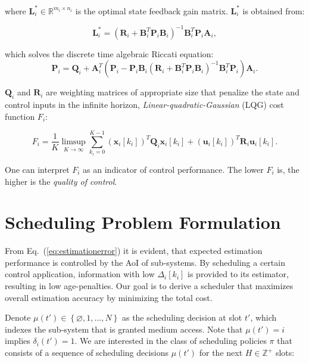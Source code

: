 where $\boldsymbol{L}_i^* \in \mathbb{R}^{m_i \times n_i}$ is the optimal state
feedback gain matrix. $\boldsymbol{L}^*_i$ is obtained from:

\begin{equation}
  \label{eq:optimalgain}
  \boldsymbol{L}_i^* = \left(\boldsymbol{R}_i + \boldsymbol{B}_i^T \boldsymbol{P}_i \boldsymbol{B}_i \right)^{-1} \boldsymbol{B}_i^T \boldsymbol{P}_i \boldsymbol{A}_i,
\end{equation}

which solves the discrete time algebraic Riccati equation:
\begin{equation}
  \label{eq:riccati}
  \boldsymbol{P}_i = \boldsymbol{Q}_{i} + \boldsymbol{A}_i^T \left(\boldsymbol{P}_i - \boldsymbol{P}_i \boldsymbol{B}_i ( \boldsymbol{R}_{i} + \boldsymbol{B}_i^T \boldsymbol{P}_i \boldsymbol{B}_i)^{- 1} \boldsymbol{B}_i^T \boldsymbol{P}_i \right) \boldsymbol{A}_i.
\end{equation}

$\boldsymbol{Q}_{i}$ and $\boldsymbol{R}_{i}$ are weighting matrices of
appropriate size that penalize the state and control inputs in the infinite
horizon, \textit{Linear-quadratic-Gaussian} (LQG) cost function $F_i$:

\begin{equation}
  F_i = \dfrac{1}{K} \limsup_{K \rightarrow \infty} \sum_{k_i=0}^{K-1} (\boldsymbol{x}_i[k_i])^T \boldsymbol{Q}_i \boldsymbol{x}_i[k_i] +  (\boldsymbol{u}_i[k_i])^T \boldsymbol{R}_i \boldsymbol{u}_i[k_i]. 
\end{equation}

One can interpret $F_i$ as an indicator of control performance. The lower $F_i$
is, the higher is the \textit{quality of control}.

\section{Scheduling Problem Formulation} \label{sec:problem} 

From Eq.~(\eqref{eq:estimationerror}) it is evident, that expected estimation
performance is controlled by the AoI of sub-systems. By scheduling a certain
control application, information with low $\Delta_i[k_i]$ is provided to its
estimator, resulting in low age-penalties. Our goal is to derive a scheduler
that maximizes overall estimation accuracy by minimizing the total cost. 

Denote $\mu(t')\in\left\{\varnothing, 1, \dots,N \right\}$ as the scheduling
decision at slot $t'$, which indexes the sub-system that is granted medium
access. Note that $\mu(t')=i$ implies $\delta_i(t')=1$. We are interested in the
class of scheduling policies $\pi$ that consists of a sequence of scheduling
decisions $\mu(t')$ for the next $H \in \mathbb{Z}^+$ slots:

